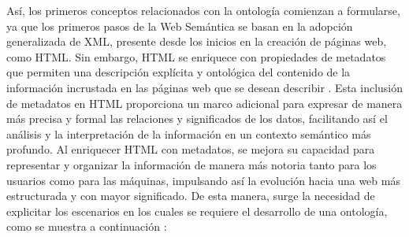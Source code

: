 \documentclass[10pt, a4paper,openany]{book}
\theoremstyle{definition}
\begin{document}
Así, los primeros conceptos relacionados con la ontología comienzan a formularse, ya que los primeros pasos de la Web Semántica se basan en la adopción generalizada de XML, presente desde los inicios en la creación de páginas web, como HTML.
Sin embargo, HTML se enriquece con propiedades de metadatos que permiten una descripción explícita y ontológica del contenido de la información incrustada en las páginas web que se desean describir \cite{bonilla_web_2006}.
Esta inclusión de metadatos en HTML proporciona un marco adicional para expresar de manera más precisa y formal las relaciones y significados de los datos, facilitando así el análisis y la interpretación de la información en un contexto semántico más profundo.
Al enriquecer HTML con metadatos, se mejora su capacidad para representar y organizar la información de manera más notoria tanto para los usuarios como para las máquinas, impulsando así la evolución hacia una web más estructurada y con mayor significado.
De esta manera, surge la necesidad de explicitar los escenarios en los cuales se requiere el desarrollo de una ontología, como se muestra a continuación \cite{filho_ontology_nodate}:
\end{document}
